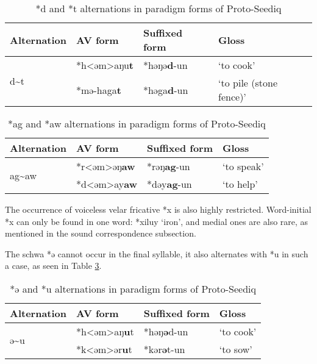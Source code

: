 \documentclass[12pt]{article}
\newcommand{\psedf}{Proto-Seediq\xspace}
\begin{document}
\begin{table}[!htbp]
\centering
\caption{*d and *t alternations in paradigm forms of \psedf}
\label{tab:dandt}
\begin{tabular}{llll}
\hline
Alternation              & AV form  & Suffixed form & Gloss                   \\ \hline
\multirow{2}{*}{d\~{ }t} & *h<əm>aŋu\textbf{t} & *həŋə\textbf{d}-un     & `to cook'               \\
                         & *mə-haga\textbf{t} & *həga\textbf{d}-un     & `to pile (stone fence)' \\ \hline
\end{tabular}
\end{table}

\begin{table}[!htbp]
\centering
\caption{*ag and *aw alternations in paradigm forms of \psedf}
\label{tab:agandaw}
\begin{tabular}{llll}
\hline
Alternation              & AV form  & Suffixed form & Gloss                   \\ \hline
\multirow{2}{*}{ag\~{ }aw} & *r<əm>əŋ\textbf{aw} & *rəŋ\textbf{ag}-un     & `to speak'               \\
                         & *d<əm>ay\textbf{aw} & *dəy\textbf{ag}-un     & `to help' \\ \hline
\end{tabular}
\end{table}

The occurrence of voiceless velar fricative *x is also highly restricted. Word-initial *x can only be found in one word: *xiluy `iron', and medial ones are also rare, as mentioned in the sound correspondence subsection. 

The schwa *ə cannot occur in the final syllable, it also alternates with *u in such a case, as seen in Table \ref{tab:schwaandu}.

\begin{table}[!htbp]
\centering
\caption{*ə and *u alternations in paradigm forms of \psedf}
\label{tab:schwaandu}
\begin{tabular}{llll}
\hline
Alternation              & AV form    & Suffixed form & Gloss     \\ \hline
\multirow{2}{*}{ə\~{ }u} & *h<əm>aŋ\textbf{u}t & *həŋ\textbf{ə}d-un     & `to cook' \\
                         & *k<əm>ər\textbf{u}t & *kər\textbf{ə}t-un     & `to sow'   \\ \hline
\end{tabular}
\end{table}
\end{document}

